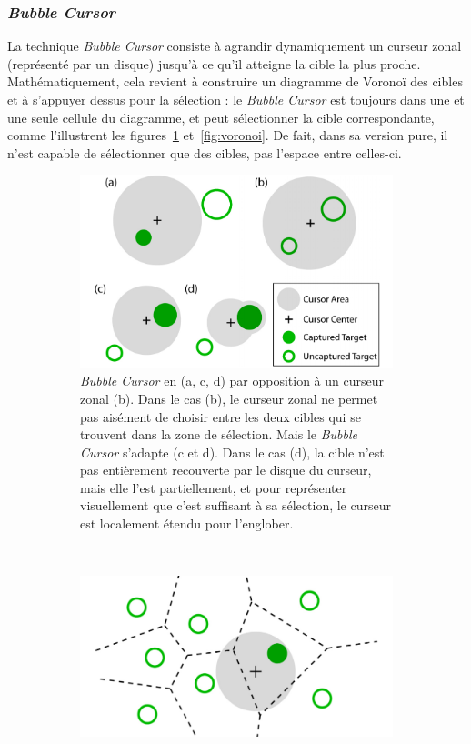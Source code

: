 	\subsubsection{\emph{Bubble Cursor}}
	La technique \emph{Bubble Cursor} consiste à agrandir dynamiquement un curseur zonal (représenté par un disque) jusqu'à ce qu'il atteigne la cible la plus proche. Mathématiquement, cela revient à construire un diagramme de Voronoï des cibles et à s'appuyer dessus pour la sélection : le \emph{Bubble Cursor} est toujours dans une et une seule cellule du diagramme, et peut sélectionner la cible correspondante, comme l'illustrent les figures~\ref{fig:bubble} et~\ref{fig:voronoi}. De fait, dans sa version pure, il n'est capable de sélectionner que des cibles, pas l'espace entre celles-ci.	

	\begin{figure}[!htb]
		\begin{subfigure}[t]{0.49\textwidth}
			\centering
			\includegraphics[width=\textwidth]{figures/ch2/bubble}
			\caption{\emph{Bubble Cursor} en (a, c, d) par opposition à un curseur zonal (b). Dans le cas (b), le curseur zonal ne permet pas aisément de choisir entre les deux cibles qui se trouvent dans la zone de sélection. Mais le \emph{Bubble Cursor} s'adapte (c et d). Dans le cas (d), la cible n'est pas entièrement recouverte par le disque du curseur, mais elle l'est partiellement, et pour représenter visuellement que c'est suffisant à sa sélection, le curseur est localement étendu pour l'englober.}
			\label{fig:bubble}
		\end{subfigure}
		~
		\begin{subfigure}[t]{0.49\textwidth}
			\centering
			\includegraphics[width=\textwidth]{figures/ch2/voronoi}

\end{subfigure}
\end{figure}
